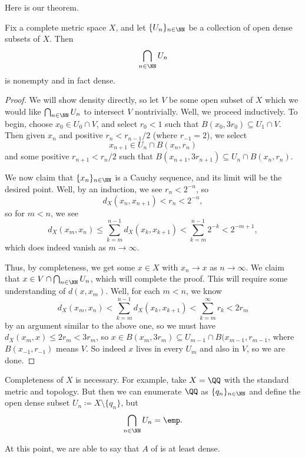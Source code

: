 \documentclass[../notes.tex]{subfiles}
\begin{document}
Here is our theorem.
\begin{theorem}[Baire] \label{thm:baire-1}
	Fix a complete metric space $X$, and let $\{U_n\}_{n\in\NN}$ be a collection of open dense subsets of $X$. Then
	\[\bigcap_{n\in\NN}U_n\]
	is nonempty and in fact dense.
\end{theorem}
\begin{proof}
	We will show density directly, so let $V$ be some open subset of $X$ which we would like $\bigcap_{n\in\NN}U_n$ to intersect $V$ nontrivially. Well, we proceed inductively. To begin, choose $x_0\in U_0\cap V$, and select $r_0<1$ such that $B(x_0,3r_0)\subseteq U_1\cap V$. Then given $x_n$ and positive $r_n<r_{n-1}/2$ (where $r_{-1}=2$), we select
	\[x_{n+1}\in U_n\cap B(x_n,r_n)\]
	and some positive $r_{n+1}<r_n/2$ such that $B(x_{n+1},3r_{n+1})\subseteq U_n\cap B(x_n,r_n)$.

	We now claim that $\{x_n\}_{n\in\NN}$ is a Cauchy sequence, and its limit will be the desired point. Well, by an induction, we see $r_n<2^{-n}$, so
	\[d_X(x_n,x_{n+1})<r_n<2^{-n},\]
	so for $m<n$, we see
	\[d_X(x_m,x_n)\le\sum_{k=m}^{n-1}d_X(x_k,x_{k+1})<\sum_{k=m}^{n-1}2^{-k}<2^{-m+1},\]
	which does indeed vanish as $m\to\infty$.

	Thus, by completeness, we get some $x\in X$ with $x_n\to x$ as $n\to\infty$. We claim that $x\in V\cap\bigcap_{n\in\NN}U_n$, which will complete the proof. This will require some understanding of $d(x,x_m)$. Well, for each $m<n$, we know
	\[d_X(x_m,x_n)<\sum_{k=m}^{n-1}d_X(x_k,x_{k+1})<\sum_{k=m}^\infty r_k<2r_m\]
	by an argument similar to the above one, so we must have $d_X(x_m,x)\le2r_m<3r_m$, so $x\in B(x_m,3r_m)\subseteq U_{m-1}\cap B(x_{m-1},r_{m-1}$, where $B(x_{-1},r_{-1})$ means $V$. So indeed $x$ lives in every $U_m$ and also in $V$, so we are done.
\end{proof}
\begin{remark}
	Completeness of $X$ is necessary. For example, take $X=\QQ$ with the standard metric and topology. But then we can enumerate $\QQ$ as $\{q_n\}_{n\in\NN}$ and define the open dense subset $U_n\coloneqq X\setminus\{q_n\}$, but
	\[\bigcap_{n\in\NN}U_n=\emp.\]
\end{remark}
At this point, we are able to say that $A$ of  is at least dense.
\end{document}
